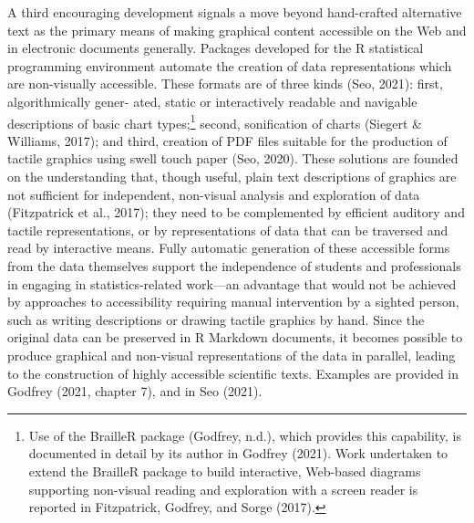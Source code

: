 \documentclass[11pt]{sig-alternate}
\begin{document}
\begin{large}
A third encouraging development signals a move beyond hand-crafted alternative text as the primary means of making graphical content accessible on the Web and in electronic documents generally. Packages developed for the R statistical programming environment automate the creation of data representations which are non-visually accessible. These formats are of three kinds (Seo, 2021): first, algorithmically gener- ated, static or interactively readable and navigable descriptions of basic chart types;\footnote{Use of the BrailleR package (Godfrey, n.d.), which provides this capability, is documented in detail by its author in Godfrey (2021). Work undertaken to extend the BrailleR package to build interactive, Web-based diagrams supporting non-visual reading and exploration with a screen reader is reported in Fitzpatrick, Godfrey, and Sorge (2017).} second, sonification of charts (Siegert \& Williams, 2017); and third, creation of PDF files suitable for the production of tactile graphics using swell touch paper (Seo, 2020). These solutions are founded on the understanding that, though useful, plain text descriptions of graphics are not sufficient for independent, non-visual analysis and exploration of data (Fitzpatrick et al., 2017); they need to be complemented by efficient auditory and tactile representations, or by representations of data that can be traversed and read by interactive means. Fully automatic generation of these accessible forms from the data themselves support the independence of students and professionals in engaging in statistics-related work—an advantage that would not be achieved by approaches to accessibility requiring manual intervention by a sighted person, such as writing descriptions or drawing tactile graphics by hand. Since the original data can be preserved in R Markdown documents, it becomes possible to produce graphical and non-visual representations of the data in parallel, leading to the construction of highly accessible scientific texts. Examples are provided in Godfrey (2021, chapter 7), and in Seo (2021).


\end{large}
\end{document}
